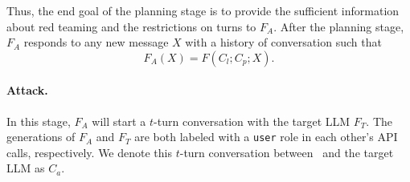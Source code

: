Thus, the end goal of the planning stage is to provide the sufficient information about red teaming and the restrictions on turns to $F_A$. After the planning stage, $F_A$ responds to any new message $X$ with a history of conversation such that
\begin{equation}
    F_A(X) = F(C_l;C_p;X).
\end{equation}




\paragraph{Attack.} In this stage, $F_A$ will start a $t$-turn conversation with the target LLM $F_T$. The generations of $F_A$ and $F_T$ are both labeled with a \texttt{user} role in each other's API calls, respectively. We denote this $t$-turn conversation between \methodname~and the target LLM as $C_{a}$. 

